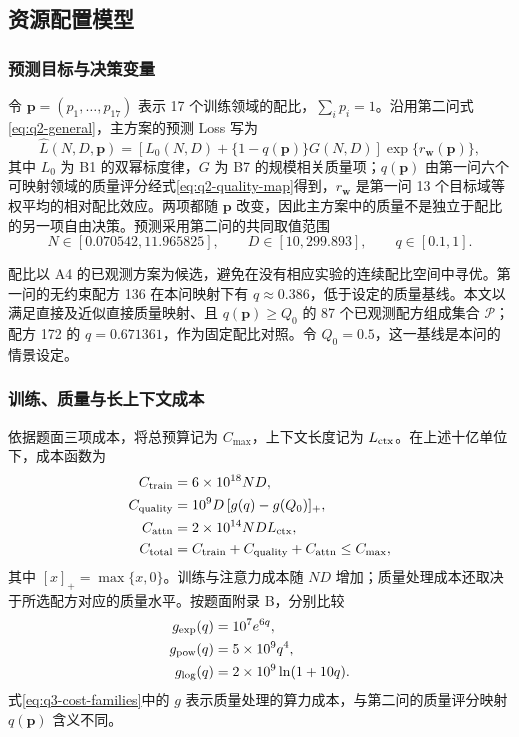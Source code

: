 \subsection{资源配置模型}

\subsubsection{预测目标与决策变量}

令 $\boldsymbol p=(p_1,\ldots,p_{17})$ 表示 17 个训练领域的配比，$\sum_i p_i=1$。沿用第二问式\eqref{eq:q2-general}，主方案的预测 Loss 写为
\begin{equation}
 \widehat L(N,D,\boldsymbol p)
 =\left[L_0(N,D)+\{1-q(\boldsymbol p)\}G(N,D)\right]
   \exp\{r_{\boldsymbol w}(\boldsymbol p)\},
 \label{eq:q3-objective}
\end{equation}
其中 $L_0$ 为 B1 的双幂标度律，$G$ 为 B7 的规模相关质量项；$q(\boldsymbol p)$ 由第一问六个可映射领域的质量评分经式\eqref{eq:q2-quality-map}得到，$r_{\boldsymbol w}$ 是第一问 13 个目标域等权平均的相对配比效应。两项都随 $\boldsymbol p$ 改变，因此主方案中的质量不是独立于配比的另一项自由决策。预测采用第二问的共同取值范围
\begin{equation}
 N\in[0.070542,11.965825],\qquad
 D\in[10,299.893],\qquad q\in[0.1,1].
 \label{eq:q3-support}
\end{equation}

配比以 A4 的已观测方案为候选，避免在没有相应实验的连续配比空间中寻优。第一问的无约束配方 136 在本问映射下有 $q\approx0.386$，低于设定的质量基线。本文以满足直接及近似直接质量映射、且 $q(\boldsymbol p)\geq Q_0$ 的 87 个已观测配方组成集合 $\mathcal P$；配方 172 的 $q=0.671361$，作为固定配比对照。令 $Q_0=0.5$，这一基线是本问的情景设定。

\subsubsection{训练、质量与长上下文成本}

依据题面三项成本，将总预算记为 $C_{\max}$，上下文长度记为 $L_{\rm ctx}$。在上述十亿单位下，成本函数为
\begin{align}
 C_{\rm train}&=6\times10^{18}ND,\nonumber\\
 C_{\rm quality}&=10^9D\,[g(q)-g(Q_0)]_+,\nonumber\\
 C_{\rm attn}&=2\times10^{14}NDL_{\rm ctx},\nonumber\\
 C_{\rm total}&=C_{\rm train}+C_{\rm quality}+C_{\rm attn}
                  \leq C_{\max},
 \label{eq:q3-cost}
\end{align}
其中 $[x]_+=\max\{x,0\}$。训练与注意力成本随 $ND$ 增加；质量处理成本还取决于所选配方对应的质量水平。按题面附录 B，分别比较
\begin{equation}
 \begin{aligned}
 g_{\rm exp}(q)&=10^7e^{6q},\\
 g_{\rm pow}(q)&=5\times10^9q^4,\\
 g_{\rm log}(q)&=2\times10^9\ln(1+10q).
 \end{aligned}
 \label{eq:q3-cost-families}
\end{equation}
式\eqref{eq:q3-cost-families}中的 $g$ 表示质量处理的算力成本，与第二问的质量评分映射 $q(\boldsymbol p)$ 含义不同。

